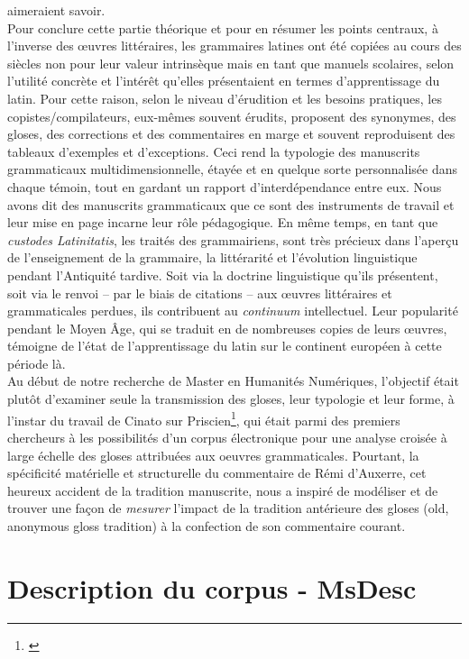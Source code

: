 \documentclass[a4paper, twoside, 12pt]{book}
\begin{document}
aimeraient savoir.\\

Pour conclure cette partie théorique et pour en résumer les points centraux, à l'inverse des œuvres littéraires, les grammaires latines ont été copiées au cours des siècles non pour leur \og{}valeur intrinsèque \fg{} mais en tant que manuels scolaires, selon l’utilité concrète et l’intérêt qu’elles présentaient en termes d’apprentissage du latin. Pour cette raison, selon le niveau d’érudition et les besoins pratiques, les copistes/compilateurs, eux-mêmes souvent érudits, proposent des synonymes, des gloses, des corrections et des commentaires en marge et souvent reproduisent des tableaux d'exemples et d'exceptions. Ceci rend la typologie des manuscrits grammaticaux multidimensionnelle, étayée et en quelque sorte personnalisée dans chaque témoin, tout en gardant un rapport d'interdépendance entre eux. Nous avons dit des manuscrits grammaticaux que ce sont des instruments de travail et leur mise en page incarne leur rôle pédagogique. En même temps, en tant que \textit{custodes Latinitatis}, les traités des grammairiens, sont très précieux dans l’aperçu de l’enseignement de la grammaire, la littérarité et l’évolution linguistique pendant l’Antiquité tardive. Soit via la doctrine linguistique qu’ils présentent, soit via le renvoi – par le biais de citations – aux œuvres littéraires et grammaticales perdues, ils contribuent au \textit{continuum} intellectuel. Leur popularité pendant le Moyen Âge, qui se traduit en de nombreuses copies de leurs œuvres, témoigne de l’état de l’apprentissage du latin sur le continent européen à cette période là.\\


Au début de notre recherche de Master en Humanités Numériques, l'objectif était plutôt d'examiner seule la transmission des gloses, leur typologie et leur forme, à l'instar du travail de Cinato sur Priscien\footnote{\cite{cinato2015priscien}}, qui était parmi des premiers chercheurs à les possibilités d'un corpus électronique pour une analyse croisée à large échelle des gloses attribuées aux oeuvres grammaticales. Pourtant, la spécificité matérielle et structurelle du commentaire de Rémi d'Auxerre, cet heureux accident de la tradition manuscrite, nous a inspiré de modéliser et de trouver une façon de \textit{mesurer} l'impact de la tradition antérieure des gloses (old, anonymous gloss tradition) à la confection de son commentaire courant.\\


\section{Description du corpus - MsDesc}
\end{document}

